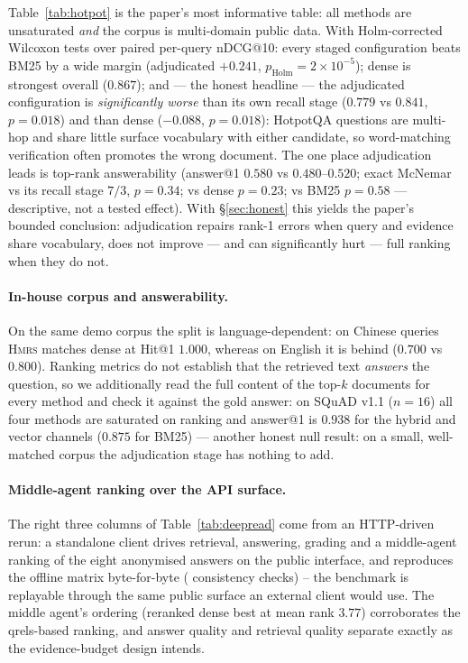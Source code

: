 \documentclass[sigconf, review, anonymous]{acmart}
\newcommand{\sys}{\textsc{Hmrs}}
\begin{document}
Table~\ref{tab:hotpot} is the paper's most informative table: all methods are
unsaturated \emph{and} the corpus is multi-domain public data. With
Holm-corrected Wilcoxon tests over paired per-query nDCG@10: every staged
configuration beats BM25 by a wide margin (adjudicated $+0.241$,
$p_{\mathrm{Holm}}{=}2\times10^{-5}$); dense is strongest overall ($0.867$);
and --- the honest headline --- the adjudicated configuration is
\emph{significantly worse} than its own recall stage ($0.779$ vs $0.841$,
$p{=}0.018$) and than dense ($-0.088$, $p{=}0.018$): HotpotQA questions are
multi-hop and share little surface vocabulary with either candidate, so
word-matching verification often promotes the wrong document. The one place
adjudication leads is top-rank answerability (answer@1 $0.580$ vs
$0.480$--$0.520$; exact McNemar vs its recall stage $7/3$, $p{=}0.34$; vs
dense $p{=}0.23$; vs BM25 $p{=}0.58$ --- descriptive, not a tested effect).
With \S\ref{sec:honest} this yields the paper's bounded conclusion:
adjudication repairs rank-1 errors when query and evidence share vocabulary,
does not improve --- and can significantly hurt --- full ranking when they
do not.

\paragraph{In-house corpus and answerability.}
On the same demo corpus the split is language-dependent: on Chinese queries
\sys{} matches dense at Hit@1 $1.000$, whereas on English it is behind
($0.700$ vs $0.800$). Ranking metrics do not establish that the retrieved
text \emph{answers} the question, so we additionally read the full content of
the top-$k$ documents for every method and check it against the gold answer:
on SQuAD v1.1 ($n{=}16$) all four methods are saturated on ranking and
answer@1 is $0.938$ for the hybrid and vector channels ($0.875$ for BM25)
--- another honest null result: on a small, well-matched corpus the
adjudication stage has nothing to add.

\paragraph{Middle-agent ranking over the API surface.} The right three
columns of Table~\ref{tab:deepread} come from an HTTP-driven rerun: a
standalone client drives retrieval, answering, grading and a middle-agent
ranking of the eight anonymised answers on the public interface, and
reproduces the offline matrix byte-for-byte (\apiconsist{} consistency
checks) -- the benchmark is replayable through the same public surface an
external client would use. The middle agent's ordering (reranked dense best
at mean rank $3.77$) corroborates the qrels-based ranking, and answer quality
and retrieval quality separate exactly as the evidence-budget design intends.
\end{document}
